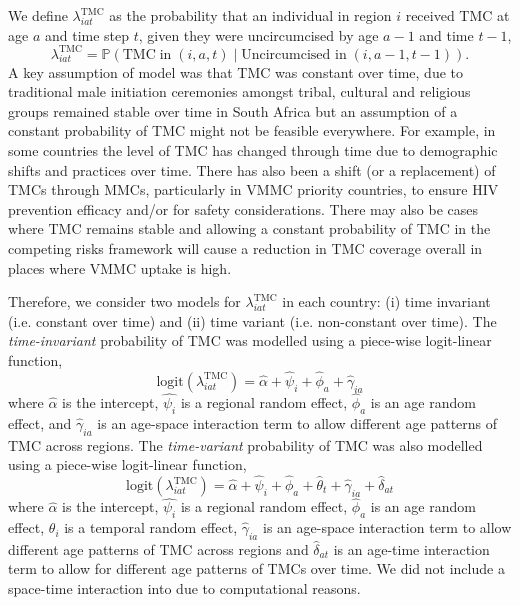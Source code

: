 \documentclass{article}
\begin{document}
\begin{appendix}
\noindent We define $\lambda^{\text{TMC}}_{iat}$ as the probability that an individual in region $i$ received TMC at age $a$ and time step $t$, given they were uncircumcised by age $a-1$ and time $t-1$, 
\begin{equation} 
		\lambda^{\text{TMC}}_{iat} = \mathbb{P}(\text{TMC} \; \text{in} \; (i,a,t) \; | \; \text{Uncircumcised in} \; (i,a-1, t-1)). 
	\label{eqn::TMC}
\end{equation}
A key assumption of \cite{thomas2021multilevel} model was that TMC was constant over time, due to traditional male initiation ceremonies amongst tribal, cultural and religious groups remained stable over time in South Africa but an assumption of a constant probability of TMC might not be feasible everywhere. For example, in some countries the level of TMC has changed through time due to demographic shifts and practices over time. There has also been a shift (or a replacement) of TMCs through MMCs, particularly in VMMC priority countries, to ensure HIV prevention efficacy and/or for safety considerations. There may also be cases where TMC remains stable and allowing a constant probability of TMC in the competing risks framework will cause a reduction in TMC coverage overall in places where VMMC uptake is high.

Therefore, we consider two models for $\lambda^{\text{TMC}}_{iat}$ in each country: (i) time invariant (i.e. constant over time) and (ii) time variant (i.e. non-constant over time). The {\it time-invariant} probability of TMC was modelled using a piece-wise logit-linear function, 
\begin{equation*} 
	\text{logit}(\lambda^{\text{TMC}}_{iat}) = \hat{\alpha} + \hat{\psi}_i + \hat{\phi}_a + \hat{\gamma}_{ia}
\end{equation*}
where $\hat{\alpha}$ is the intercept, $\hat{\psi_i}$ is a regional random effect, $\hat{\phi}_a$ is an age random effect, and $\hat{\gamma}_{ia}$ is an age-space interaction term to allow different age patterns of TMC across regions. The {\it time-variant} probability of TMC was also modelled using a piece-wise logit-linear function, 
\begin{equation*} 
	\text{logit}(\lambda^{\text{TMC}}_{iat}) = \hat{\alpha} + \hat{\psi}_i + \hat{\phi}_a + \hat{\theta}_t + \hat{\gamma}_{ia} + \hat{\delta}_{at}
\end{equation*}
where $\hat{\alpha}$ is the intercept, $\hat{\psi_i}$ is a regional random effect, $\hat{\phi}_a$ is an age random effect, $\theta_i$ is a temporal random effect,  $\hat{\gamma}_{ia}$ is an age-space interaction term to allow different age patterns of TMC  across regions and $\hat{\delta}_{at}$ is an age-time interaction term to allow for different age patterns of TMCs over time. We did not include a space-time interaction into due to computational reasons. 


\end{appendix}
\end{document}
